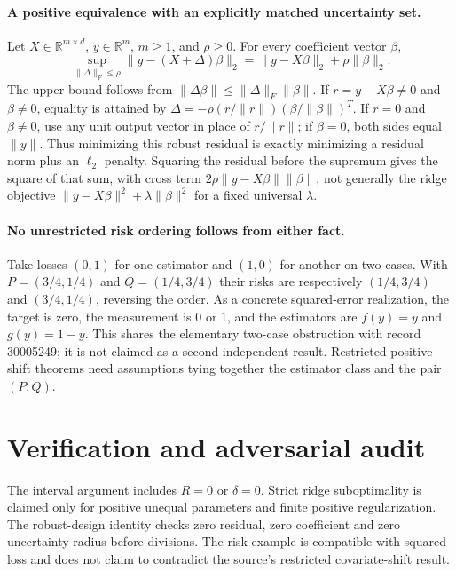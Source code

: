 \documentclass[11pt]{article}
\begin{document}
\paragraph{A positive equivalence with an explicitly matched uncertainty set.}
Let $X\in\mathbb R^{m\times d}$, $y\in\mathbb R^m$, $m\geq1$, and
$\rho\geq0$. For every coefficient vector $\beta$,
\[
 \sup_{\|\Delta\|_F\leq\rho}\|y-(X+\Delta)\beta\|_2
 =\|y-X\beta\|_2+\rho\|\beta\|_2.
\]
The upper bound follows from $\|\Delta\beta\|\leq\|\Delta\|_F\|\beta\|$.
If $r=y-X\beta\ne0$ and $\beta\ne0$, equality is attained by
$\Delta=-\rho(r/\|r\|)(\beta/\|\beta\|)^T$.
If $r=0$ and $\beta\ne0$, use any unit output vector in place of $r/\|r\|$;
if $\beta=0$, both sides equal $\|y\|$.
Thus minimizing this robust residual is exactly minimizing a residual norm plus
an $\ell_2$ penalty. Squaring the residual before the supremum gives the
square of that sum, with cross term
$2\rho\|y-X\beta\|\|\beta\|$, not generally the ridge objective
$\|y-X\beta\|^2+\lambda\|\beta\|^2$ for a fixed universal $\lambda$.

\paragraph{No unrestricted risk ordering follows from either fact.}
Take losses $(0,1)$ for one estimator and $(1,0)$ for another on two cases.
With $P=(3/4,1/4)$ and $Q=(1/4,3/4)$ their risks are respectively
$(1/4,3/4)$ and $(3/4,1/4)$, reversing the order.
As a concrete squared-error realization, the target is zero, the measurement is
$0$ or $1$, and the estimators are $f(y)=y$ and $g(y)=1-y$.
This shares the elementary two-case obstruction with record 30005249; it is
not claimed as a second independent result. Restricted positive shift theorems
need assumptions tying together the estimator class and the pair $(P,Q)$.

\section{Verification and adversarial audit}

The interval argument includes $R=0$ or $\delta=0$. Strict ridge suboptimality
is claimed only for positive unequal parameters and finite positive regularization.
The robust-design identity checks zero residual, zero coefficient and zero
uncertainty radius before divisions. The risk example is compatible with squared
loss and does not claim to contradict the source's restricted covariate-shift result.
\end{document}
